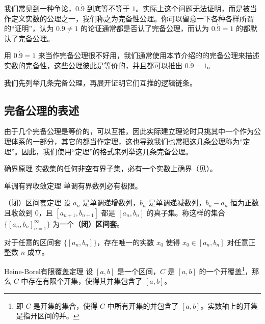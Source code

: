 


我们常见到一种争论，$0.\dot{9}$ 到底等不等于 $1$。实际上这个问题无法证明，而是被当作定义实数的公理之一，我们称之为完备性公理。你可以留意一下各种各样所谓的“证明”，认为 $0.\dot{9}\neq 1$ 的论证通常都是否认了完备公理，而认为 $0.\dot{9}=1$ 的都默认了完备公理。

用 $0.\dot{9}=1$ 来当作完备公理很不好用，我们通常使用本节介绍的的完备公理来描述实数的完备性，这些公理彼此是等价的，并且都可以推出 $0.\dot{9}=1$。

我们先列举几条完备公理，再展开证明它们互推的逻辑链条。

\subsection{完备公理的表述}

由于几个完备公理是等价的，可以互推，因此实际建立理论时只挑其中一个作为公理体系的一部分，其它的都当作定理，这也导致我们也常把这几条公理称为“定理”。因此，我们使用“定理”的格式来列举这几条完备公理。

\begin{theorem}{确界原理}\label{the_RCompl_1}
实数集的任何非空有界子集，必有一个实数上确界（见）。
\end{theorem}

\begin{theorem}{单调有界收敛定理}\label{the_RCompl_2}
单调有界数列必有极限。
\end{theorem}

\begin{theorem}{（闭）区间套定理}\label{the_RCompl_3}
设 $a_n$ 是单调递增数列，$b_n$ 是单调递减数列，$b_n-a_n$ 恒为正数且收敛到 $0$，且 $[a_{n+1}, b_{n+1}]$ 都是 $[a_n, b_n]$ 的真子集。称这样的集合 $\{[a_n, b_n]_{n=1}^\infty\}$ 为一个\textbf{（闭）区间套}。

对于任意的区间套 $\{[a_n, b_n]\}$，存在唯一的实数 $x_0$ 使得 $x_0\in [a_n, b_n]$ 对任意正整数 $n$ 成立。
\end{theorem}

\begin{theorem}{Heine-Borel有限覆盖定理}\label{the_RCompl_4}
设 $[a, b]$ 是一个区间，$C$ 是 $[a, b]$ 的一个开覆盖\footnote{即 $C$ 是开集的集合，使得 $C$ 中所有开集的并包含了 $[a, b]$。实数轴上的开集是指开区间的并。}，那么 $C$ 中存在有限个开集，使得其并集包含了 $[a, b]$。
\end{theorem}

